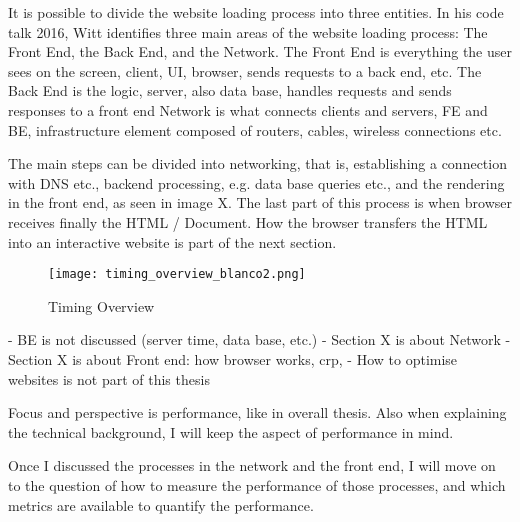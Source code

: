 
It is possible to divide the website loading process into three entities.
In his code talk 2016, Witt identifies three main areas of the website loading process: The Front End, the Back End, and the Network.  %
The Front End is everything the user sees on the screen, client, UI, browser, sends requests to a back end, etc.
The Back End is the logic, server, also data base, handles requests and sends responses to a front end
Network is what connects clients and servers, FE and BE, infrastructure element composed of routers, cables, wireless connections etc.

The main steps can be divided into networking, that is, establishing a connection with DNS etc., backend processing, e.g. data base queries etc., and the rendering in the front end, as seen in image X.
The last part of this process is when browser receives finally the HTML / Document. 
How the browser transfers the HTML into an interactive website is part of the next section.



\begin{figure}[h!]
\begin{center}
\texttt{[image: timing\_overview\_blanco2.png]}
\caption{Timing Overview}
\label{img:timing_overview}
\end{center}
\end{figure}


- BE is not discussed (server time, data base, etc.)
- Section X is about Network
- Section X is about Front end: how browser works, crp, 
- How to optimise websites is not part of this thesis





Focus and perspective is performance, like in overall thesis.
Also when explaining the technical background, I will keep the aspect of performance in mind.

Once I discussed the processes in the network and the front end, I will move on to the question of how to measure the performance of those processes, and which metrics are available to quantify the performance.







